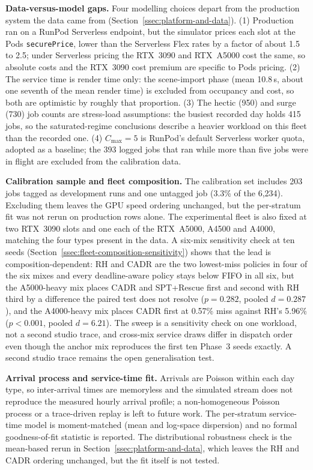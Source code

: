 {\textbf{Data-versus-model gaps.} Four modelling choices depart from the production system the data came from (Section~\ref{ssec:platform-and-data}). (1) Production ran on a RunPod Serverless endpoint, but the simulator prices each slot at the Pods \texttt{securePrice}, lower than the Serverless Flex rates by a factor of about 1.5 to 2.5; under Serverless pricing the RTX~3090 and RTX~A5000 cost the same, so absolute costs and the RTX~3090 cost premium are specific to Pods pricing. (2) The service time is render time only: the scene-import phase (mean 10.8\,s, about one seventh of the mean render time) is excluded from occupancy and cost, so both are optimistic by roughly that proportion. (3) The hectic (950) and surge (730) job counts are stress-load assumptions: the busiest recorded day holds 415 jobs, so the saturated-regime conclusions describe a heavier workload on this fleet than the recorded one. (4) $C_{\max}=5$ is RunPod's default Serverless worker quota, adopted as a baseline; the 393 logged jobs that ran while more than five jobs were in flight are excluded from the calibration data.

\textbf{Calibration sample and fleet composition.} The calibration set includes 203 jobs tagged as development runs and one untagged job (3.3\% of the 6,234). Excluding them leaves the GPU speed ordering unchanged, but the per-stratum fit was not rerun on production rows alone. The experimental fleet is also fixed at two RTX~3090 slots and one each of the RTX~A5000, A4500 and A4000, matching the four types present in the data. A six-mix sensitivity check at ten seeds (Section~\ref{ssec:fleet-composition-sensitivity}) shows that the lead is composition-dependent: RH and CADR are the two lowest-miss policies in four of the six mixes and every deadline-aware policy stays below FIFO in all six, but the A5000-heavy mix places CADR and SPT+Rescue first and second with RH third by a difference the paired test does not resolve ($p=0.282$, pooled $d=0.287$), and the A4000-heavy mix places CADR first at 0.57\% miss against RH's 5.96\% ($p<0.001$, pooled $d=6.21$). The sweep is a sensitivity check on one workload, not a second studio trace, and cross-mix service draws differ in dispatch order even though the anchor mix reproduces the first ten Phase~3 seeds exactly. A second studio trace remains the open generalisation test.

\textbf{Arrival process and service-time fit.} Arrivals are Poisson within each day type, so inter-arrival times are memoryless and the simulated stream does not reproduce the measured hourly arrival profile; a non-homogeneous Poisson process or a trace-driven replay is left to future work. The per-stratum service-time model is moment-matched (mean and log-space dispersion) and no formal goodness-of-fit statistic is reported. The distributional robustness check is the mean-based rerun in Section~\ref{ssec:platform-and-data}, which leaves the RH and CADR ordering unchanged, but the fit itself is not tested.

}

